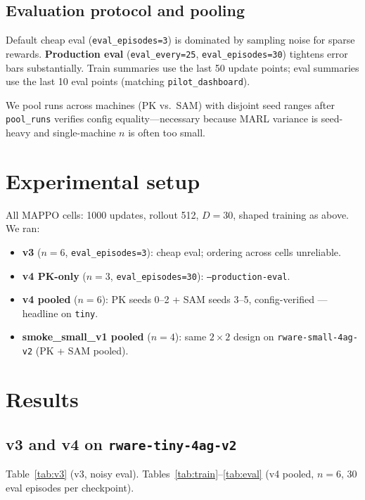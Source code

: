 \documentclass[conference,onecolumn]{IEEEtran}
\begin{document}
\subsection{Evaluation protocol and pooling}

Default cheap eval (\texttt{eval\_episodes=3}) is dominated by sampling noise for sparse rewards. \textbf{Production eval} (\texttt{eval\_every=25}, \texttt{eval\_episodes=30}) tightens error bars substantially. Train summaries use the last 50 update points; eval summaries use the last 10 eval points (matching \texttt{pilot\_dashboard}).

We pool runs across machines (PK vs.\ SAM) with disjoint seed ranges after \texttt{pool\_runs} verifies config equality---necessary because MARL variance is seed-heavy and single-machine $n$ is often too small.

\section{Experimental setup}

All MAPPO cells: 1000 updates, rollout 512, $D{=}30$, shaped training as above. We ran:

\begin{itemize}
  \item \textbf{v3} ($n{=}6$, \texttt{eval\_episodes=3}): cheap eval; ordering across cells unreliable.
  \item \textbf{v4 PK-only} ($n{=}3$, \texttt{eval\_episodes=30}): \texttt{--production-eval}.
  \item \textbf{v4 pooled} ($n{=}6$): PK seeds 0--2 + SAM seeds 3--5, config-verified --- headline on \texttt{tiny}.
  \item \textbf{smoke\_small\_v1 pooled} ($n{=}4$): same $2{\times}2$ design on \texttt{rware-small-4ag-v2} (PK + SAM pooled).
\end{itemize}

\section{Results}

\subsection{v3 and v4 on \texttt{rware-tiny-4ag-v2}}

Table~\ref{tab:v3} (v3, noisy eval). Tables~\ref{tab:train}--\ref{tab:eval} (v4 pooled, $n{=}6$, 30 eval episodes per checkpoint).
\end{document}
